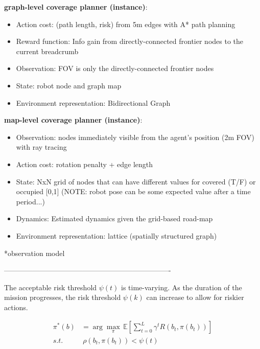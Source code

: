 \documentclass{article}
\newcommand{\ph}[1]{{\textbf{#1}:}} %
\begin{document}
\ph{graph-level coverage planner (instance)}

\begin{itemize}
    \item Action cost: (path length, risk) from 5m edges with A* path planning
    \item Reward function: Info gain from directly-connected frontier nodes to the current breadcrumb
    \item Observation: FOV is only the directly-connected frontier nodes
    \item State: robot node and graph map
    \item Environment representation: Bidirectional Graph
\end{itemize}


\ph{map-level coverage planner (instance)}
\begin{itemize}
    \item Observation: nodes immediately visible from the agent's position (2m FOV) with ray tracing
    \item Action cost: rotation penalty + edge length
    \item State: NxN grid of nodes that can have different values for covered (T/F) or occupied [0,1]
        (NOTE: robot pose can be some expected value after a time period...)
    \item Dynamics: Estimated dynamics given the grid-based road-map
    \item Environment representation: lattice (spatially structured graph)

\end{itemize}

*observation model


----------------------------------------------------------------------

The acceptable risk threshold $\psi(t)$ is time-varying. As the duration of the mission progresses, the risk threshold $\psi(k)$ can increase to allow for riskier actions.


\begin{align}
  \pi^*(b) &= \arg\max_\pi \, \mathbb{E} \left[ \sum_{t=0}^{L} \gamma^t R(b_t, \pi(b_t)) \right] \\
  s.t.~&~\rho(b_t,\pi(b_t)) < \psi(t)
\end{align}
\end{document}
